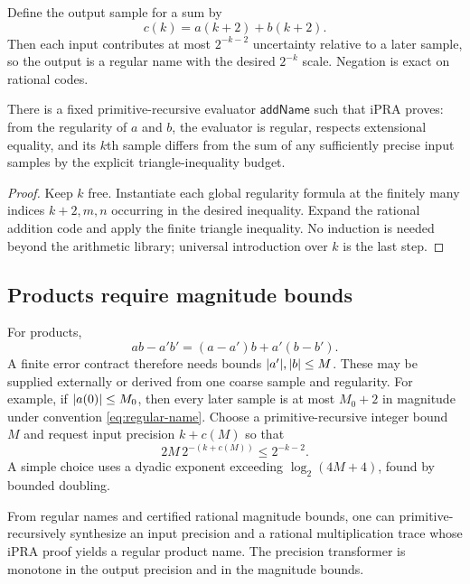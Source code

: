 Define the output sample for a sum by
\[
  c(k)=a(k+2)+b(k+2).
\]
Then each input contributes at most $2^{-k-2}$ uncertainty relative to a later sample, so the output is a regular name with the desired $2^{-k}$ scale.  Negation is exact on rational codes.

\begin{proposition}
\label{prop:add-contract}
There is a fixed primitive-recursive evaluator $\mathsf{addName}$ such that iPRA proves: from the regularity of $a$ and $b$, the evaluator is regular, respects extensional equality, and its $k$th sample differs from the sum of any sufficiently precise input samples by the explicit triangle-inequality budget.
\end{proposition}

\begin{proof}
Keep $k$ free.  Instantiate each global regularity formula at the finitely many indices $k+2,m,n$ occurring in the desired inequality.  Expand the rational addition code and apply the finite triangle inequality.  No induction is needed beyond the arithmetic library; universal introduction over $k$ is the last step.
\end{proof}

\subsection{Products require magnitude bounds}

For products,
\[
  ab-a'b'=(a-a')b+a'(b-b').
\]
A finite error contract therefore needs bounds $\lvert a'\rvert,\lvert b\rvert\le M$.  These may be supplied externally or derived from one coarse sample and regularity.  For example, if $\lvert a(0)\rvert\le M_0$, then every later sample is at most $M_0+2$ in magnitude under convention \eqref{eq:regular-name}.  Choose a primitive-recursive integer bound $M$ and request input precision $k+c(M)$ so that
\[
  2M\,2^{-(k+c(M))}\le2^{-k-2}.
\]
A simple choice uses a dyadic exponent exceeding $\log_2(4M+4)$, found by bounded doubling.

\begin{proposition}
\label{prop:product-contract}
From regular names and certified rational magnitude bounds, one can primitive-recursively synthesize an input precision and a rational multiplication trace whose iPRA proof yields a regular product name.  The precision transformer is monotone in the output precision and in the magnitude bounds.
\end{proposition}

